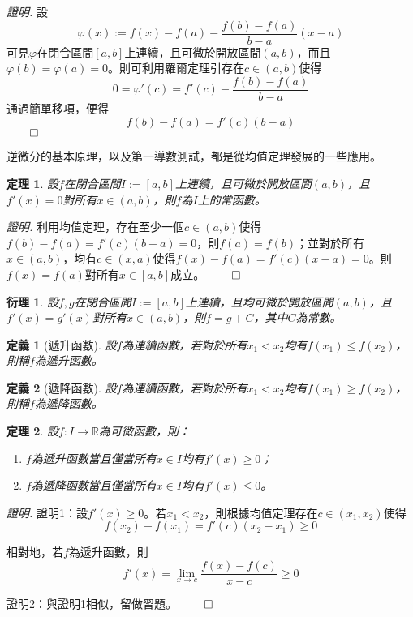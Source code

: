 \documentclass[12pt]{article}
\newtheorem{definition}{定義}
\newtheorem*{theorem}{定理}
\newtheorem*{corollary}{衍理}
\renewenvironment*{proof}{\textit{證明.}}{\hfill$\qed$}
\begin{document}
    \begin{proof}
        設$$\varphi(x):=f(x)-f(a)-\frac{f(b)-f(a)}{b-a}(x-a)$$可見$\varphi$在閉合區間$[a,b]$上連續，且可微於開放區間$(a,b)$，而且$\varphi(b)=\varphi(a)=0$。則可利用羅爾定理引存在$c\in(a,b)$使得$$0=\varphi'(c)=f'(c)-\frac{f(b)-f(a)}{b-a}$$通過簡單移項，便得$$f(b)-f(a)=f'(c)(b-a)$$
    \end{proof}

    逆微分的基本原理，以及第一導數測試，都是從均值定理發展的一些應用。

    \begin{theorem}
        設$f$在閉合區間$I:=[a,b]$上連續，且可微於開放區間$(a,b)$，且$f'(x)=0$對所有$x\in(a,b)$，則$f$為$I$上的常函數。
    \end{theorem}

    \begin{proof}
        利用均值定理，存在至少一個$c\in(a,b)$使得$f(b)-f(a)=f'(c)(b-a)=0$，則$f(a)=f(b)$；並對於所有$x\in(a,b)$，均有$c\in(x,a)$使得$f(x)-f(a)=f'(c)(x-a)=0$。則$f(x)=f(a)$對所有$x\in[a,b]$成立。
    \end{proof}

    \begin{corollary}
        設$f,g$在閉合區間$I:=[a,b]$上連續，且均可微於開放區間$(a,b)$，且$f'(x)=g'(x)$對所有$x\in(a,b)$，則$f=g+C$，其中$C$為常數。
    \end{corollary}

    \begin{definition}[遞升函數]
        設$f$為連續函數，若對於所有$x_1<x_2$均有$f(x_1)\leq f(x_2)$，則稱$f$為遞升函數。
    \end{definition}

    \begin{definition}[遞降函數]
        設$f$為連續函數，若對於所有$x_1<x_2$均有$f(x_1)\geq f(x_2)$，則稱$f$為遞降函數。
    \end{definition}

    \begin{theorem}
        設$f:I\to\mathbb{R}$為可微函數，則：\begin{enumerate}
            \item $f$為遞升函數當且僅當所有$x\in I$均有$f'(x)\geq 0$；
            \item $f$為遞降函數當且僅當所有$x\in I$均有$f'(x)\leq 0$。
        \end{enumerate}
    \end{theorem}

    \begin{proof}
        證明1：設$f'(x)\geq 0$。若$x_1<x_2$，則根據均值定理存在$c\in(x_1,x_2)$使得$$f(x_2)-f(x_1)=f'(c)(x_2-x_1)\geq 0$$
        
        相對地，若$f$為遞升函數，則$$f'(x)=\lim_{x\to c}\frac{f(x)-f(c)}{x-c}\geq 0$$

        證明2：與證明1相似，留做習題。
    \end{proof}
\end{document}
